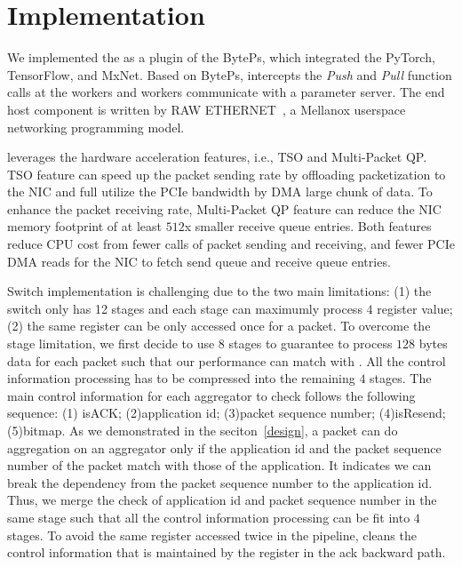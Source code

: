 \section{Implementation}
We implemented the \system as a plugin of the BytePs, 
which integrated the PyTorch, TensorFlow, and MxNet.
Based on BytePs, \system intercepts the {\it Push } and {\it Pull} function calls at the workers
and workers communicate with a \system parameter server.
The end host component is written by RAW ETHERNET~\cite{}, 
a Mellanox userspace networking programming model.

\system leverages the hardware acceleration features, i.e., TSO and Multi-Packet QP.
TSO feature can speed up the packet sending rate 
by offloading packetization to the NIC and full utilize the PCIe bandwidth by DMA large chunk of data.
To enhance the packet receiving rate, Multi-Packet QP feature can reduce the NIC memory footprint of at least $512$x smaller receive queue entries. Both features reduce CPU
cost from fewer calls of packet sending and receiving, and fewer PCIe DMA reads for
the NIC to fetch send queue and receive queue entries.
 
 
Switch implementation is challenging due to the two main limitations: 
(1) the switch only has 12 stages and each stage can maximumly process $4$ register value; 
(2) the same register can be only 
accessed once for a packet.
To overcome the stage limitation, we first decide to use $8$ stages
to guarantee to process $128$ bytes data for each packet such that 
our performance can match with \switchml.  
All the control information processing has to be compressed into the remaining $4$ stages. 
The main control information for each aggregator to check follows the following sequence:
(1) isACK; (2)application id; (3)packet sequence number; (4)isResend; (5)bitmap.
As we demonstrated in the seciton~\ref{design}, a packet can do aggregation 
on an aggregator only if the application id and the packet sequence number of 
the packet match with those of the application.
It indicates we can break the dependency from the packet sequence number to the application id.
Thus, we merge the check of application id and packet sequence number in
the same stage such that all the control information processing can be fit into $4$ stages.
To avoid the same register accessed twice in the pipeline, 
\system cleans the control information that is maintained by the register 
in the ack backward path. 
